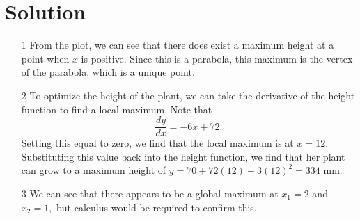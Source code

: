 \documentclass{../harvardml}
\theoremstyle{definition}
\theoremstyle{plain}
\newenvironment{solution}
  {\color{blue}\section*{Solution}}
{}
\begin{document}
\newpage


\begin{solution}
    \begin{itemize}
        \item[1] From the plot, we can see that there does exist a maximum height at a point when $x$ is positive.
        Since this is a parabola, this maximum is the vertex of the parabola, which is a unique point.
        \item[2] To optimize the height of the plant, we can take the derivative of the height function to find a local maximum. Note that 
        $$\frac{dy}{dx} = -6x + 72.$$
        Setting this equal to zero, we find that the local maximum is at $x = 12$. Substituting this value back into the height function, we find that her plant can grow to a maximum height of $y = 70 + 72(12) - 3(12)^2 = 334$ mm.
        \item[3] We can see that there appears to be a global maximum at $x_1 = 2$ and $x_2 = 1,$ but calculus would be required to confirm this. 
    \end{itemize}

	
\end{solution}

\newpage 
\end{document}
